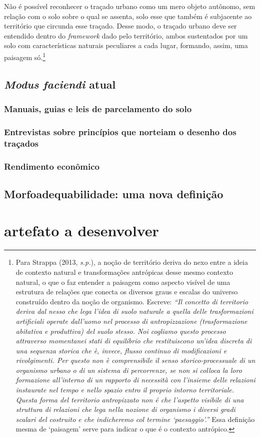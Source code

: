 \documentclass[12pt, a4paper]{book} %
\begin{document}
                Não é possível reconhecer o traçado urbano como um mero objeto autônomo, sem relação com o solo sobre o qual se assenta, solo esse que também é subjacente ao território que circunda esse traçado. Desse modo, o traçado urbano deve ser entendido dentro do \textit{framework} dado pelo território, ambos sustentados por um solo com características naturais peculiares a cada lugar, formando, assim, uma paisagem só.\footnote[13]{Para Strappa (2013, \textit{s.p.}), a noção de território deriva do nexo entre a ideia de contexto natural e transformações antrópicas desse mesmo contexto natural, o que o faz entender a paisagem como aspecto visível de uma estrutura de relações que conecta os diversos graus e escalas do universo construído dentro da noção de organismo. Escreve: \textit{``Il concetto di territorio deriva dal nesso che lega l’idea di suolo naturale a quella delle trasformazioni artificiali operate dall’uomo nel processo di antropizzazione (trasformazione abitativa e produttiva) del suolo stesso. Noi cogliamo questo processo attraverso momentanei stati di equilibrio che  restituiscono un’idea discreta di una sequenza storica che è, invece, flusso continuo di modificazioni e rivolgimenti.
                Per questo non è comprensibile il senso storico-processuale di un organismo urbano o di un sistema di percorrenze, se non si colloca la loro formazione all’interno di un rapporto di necessità con l’insieme delle relazioni instaurate nel tempo e nello spazio entro il proprio intorno territoriale. Questa forma del territorio antropizzato non é che l’aspetto visibile di una struttura di relazioni che lega nella nozione di organismo i diversi gradi scalari del costruito e che indicheremo col termine `paesaggio'.''} Essa definição mesma de `paisagem' serve para indicar o que é o contexto antrópico.}

            \section{\textit{Modus faciendi} atual}
                \subsection{Manuais, guias e leis de parcelamento do solo}
                \subsection{Entrevistas sobre princípios que norteiam o desenho dos traçados}
                \subsection{Rendimento econômico}
            \section{Morfoadequabilidade: uma nova definição} %

        
        \chapter[A escolha de uma solução]{artefato a desenvolver}
\end{document}
